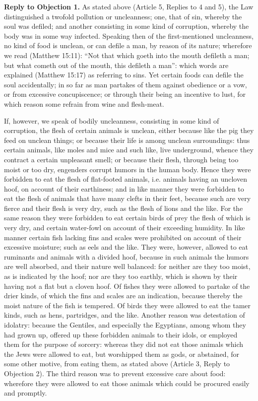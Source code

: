 \textbf{Reply to Objection 1.} As stated above (Article 5, Replies to 4 and 5), the Law distinguished a twofold pollution or uncleanness; one, that of sin, whereby the soul was defiled; and another consisting in some kind of corruption, whereby the body was in some way infected. Speaking then of the first-mentioned uncleanness, no kind of food is unclean, or can defile a man, by reason of its nature; wherefore we read (Matthew 15:11): ``Not that which goeth into the mouth defileth a man; but what cometh out of the mouth, this defileth a man'': which words are explained (Matthew 15:17) as referring to sins. Yet certain foods can defile the soul accidentally; in so far as man partakes of them against obedience or a vow, or from excessive concupiscence; or through their being an incentive to lust, for which reason some refrain from wine and flesh-meat.

If, however, we speak of bodily uncleanness, consisting in some kind of corruption, the flesh of certain animals is unclean, either because like the pig they feed on unclean things; or because their life is among unclean surroundings: thus certain animals, like moles and mice and such like, live underground, whence they contract a certain unpleasant smell; or because their flesh, through being too moist or too dry, engenders corrupt humors in the human body. Hence they were forbidden to eat the flesh of flat-footed animals, i.e. animals having an uncloven hoof, on account of their earthiness; and in like manner they were forbidden to eat the flesh of animals that have many clefts in their feet, because such are very fierce and their flesh is very dry, such as the flesh of lions and the like. For the same reason they were forbidden to eat certain birds of prey the flesh of which is very dry, and certain water-fowl on account of their exceeding humidity. In like manner certain fish lacking fins and scales were prohibited on account of their excessive moisture; such as eels and the like. They were, however, allowed to eat ruminants and animals with a divided hoof, because in such animals the humors are well absorbed, and their nature well balanced: for neither are they too moist, as is indicated by the hoof; nor are they too earthly, which is shown by their having not a flat but a cloven hoof. Of fishes they were allowed to partake of the drier kinds, of which the fins and scales are an indication, because thereby the moist nature of the fish is tempered. Of birds they were allowed to eat the tamer kinds, such as hens, partridges, and the like. Another reason was detestation of idolatry: because the Gentiles, and especially the Egyptians, among whom they had grown up, offered up these forbidden animals to their idols, or employed them for the purpose of sorcery: whereas they did not eat those animals which the Jews were allowed to eat, but worshipped them as gods, or abstained, for some other motive, from eating them, as stated above (Article 3, Reply to Objection 2). The third reason was to prevent excessive care about food: wherefore they were allowed to eat those animals which could be procured easily and promptly.

